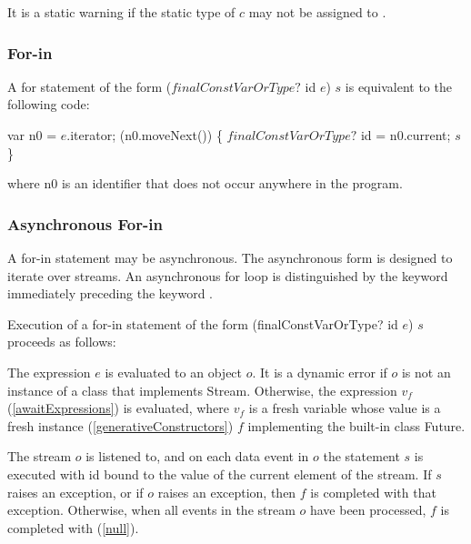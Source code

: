 \documentclass{article}
\newcommand{\code}[1]{{\sf #1}}
\begin{document}
\LMHash{}
It is a static warning if the static type of $c$ may not be assigned to .




\subsubsection{For-in}

\LMHash{}
A for statement of the form \code{ \FOR{} ($finalConstVarOrType?$ id \IN{} $e$) $s$} is equivalent to the following code: 

\begin{dartCode}
var n0 = $e$.iterator;
\WHILE{} (n0.moveNext()) \{
   $finalConstVarOrType?$ id = n0.current;
   $s$ 
\}
\end{dartCode}
where \code{n0} is an identifier that does not occur anywhere in the program.

 
\subsubsection{Asynchronous For-in}

\LMHash{}
A for-in statement may be asynchronous. The asynchronous form is designed to iterate over streams. An asynchronous for loop is distinguished by the keyword \AWAIT{} immediately preceding the keyword \FOR.

\LMHash{}
Execution of a for-in statement of the form  \code{\AWAIT{} \FOR{} (finalConstVarOrType? id \IN{} $e$) $s$} proceeds as follows:

\LMHash{}
The expression $e$ is evaluated to an object $o$. It is a dynamic error if $o$ is not an instance of a class that implements \code{Stream}. Otherwise, the expression \code{\AWAIT{} $v_f$}  (\ref{awaitExpressions}) is evaluated, where $v_f$ is a fresh variable whose value is a fresh instance (\ref{generativeConstructors}) $f$ implementing the built-in class \code{Future}.

\LMHash{}
The stream $o$ is listened to,  and on each data event in $o$ the statement $s$ is executed with \code{id} bound to the value of the current element of the stream. If $s$ raises an exception, or if $o$ raises an exception, then $f$ is completed with that exception. Otherwise, when all events in the stream $o$ have been processed, $f$ is completed with \NULL{}  (\ref{null}).
\end{document}
